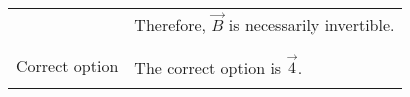 \documentclass[journal,12pt,twocolumn]{IEEEtran}
\begin{document}
\begin{table}[h!]
\begin{center}
\begin{tabular}{|p{5cm}|p{10cm}|}
& Therefore, $\vec{B}$ is necessarily invertible.\\
&\\
\hline
&\\
Correct option  & The correct option is $\vec{4}$.\\
&\\
\hline
    \end{tabular}
    \end{center}
\end{table}
\end{document}
